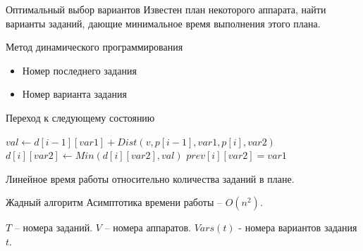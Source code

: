 \documentclass{beamer}
\begin{document}
\begin{frame}{Оптимальный выбор вариантов}
Известен план некоторого аппарата, найти варианты заданий, дающие минимальное время выполнения этого плана.

Метод динамического программирования
\begin{itemize}
\item Номер последнего задания
\item Номер варианта задания
\end{itemize}

\begin{exampleblock}{Переход к следующему состоянию}

\begin{algorithmic}
\State $val \gets d[i - 1][var1] + Dist(v, p[i - 1], var1, p[i], var2)$
    \State $d[i][var2] \gets Min(d[i][var2], val)$
    \State $prev[i][var2] = var1$
\EndIf
\end{algorithmic}
\end{exampleblock}

Линейное время работы относительно количества заданий в плане.

\end{frame}

\begin{frame}{Жадный алгоритм}
Асимптотика времени работы -- $O(n^2)$.

$T$ -- номера заданий. $V$ -- номера аппаратов. $Vars(t)$ - номера вариантов задания $t$.

\end{frame}
\end{document}
